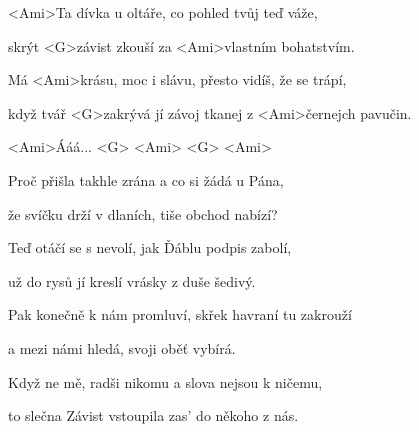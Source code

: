 

\zs
<Ami>Ta dívka u oltáře, co pohled tvůj teď váže,

skrýt <G>závist zkouší za <Ami>vlastním bohatstvím.

Má <Ami>krásu, moc i slávu, přesto vidíš, že se trápí,

když tvář <G>zakrývá jí závoj tkanej z <Ami>černejch pavučin.
\ks

\zr
<Ami>Ááá... <G> <Ami> <G> <Ami>
\kr

\zs
Proč přišla takhle zrána a co si žádá u Pána,

že svíčku drží v dlaních, tiše obchod nabízí?

\ks


\zr \kr

\zs
{}
\ks

\zr \kr

\zs
Teď otáčí se s nevolí, jak Ďáblu podpis zabolí,

už do rysů jí kreslí vrásky z duše šedivý.

Pak konečně k nám promluví, skřek havraní tu zakrouží

a mezi námi hledá, svoji oběť vybírá.

Když ne mě, radši nikomu a slova nejsou k ničemu,

to slečna Závist vstoupila zas' do někoho z nás.
\ks

\zr \kr

\kp
